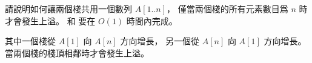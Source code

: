 \startEXERCISE
請說明如何讓兩個棧共用一個數列 $A[1..n]$，
僅當兩個棧的所有元素數目爲 $n$ 時才會發生上溢。
  和  要在 $O(1)$ 時間內完成。
\stopEXERCISE

\startANSWER
其中一個棧從 $A[1]$ 向 $A[n]$ 方向增長，
另一個從 $A[n]$ 向 $A[1]$ 方向增長。
當兩個棧的棧頂相鄰時才會發生上溢。
\stopANSWER
